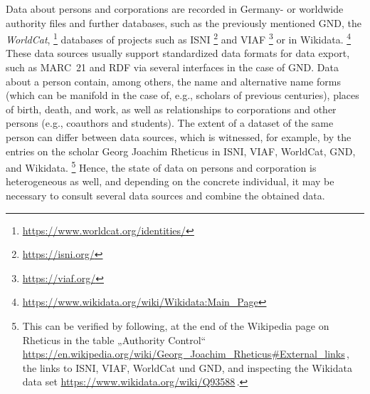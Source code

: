 Data about persons and corporations are recorded
in Germany- or worldwide authority files and further databases,
such as the previously mentioned GND,
the \emph{WorldCat},%
\footnote{\url{https://www.worldcat.org/identities/}}
databases of projects such as ISNI%
\footnote{\url{https://isni.org/}}
and VIAF%
\footnote{\url{https://viaf.org/}}
or in Wikidata.%
\footnote{\url{https://www.wikidata.org/wiki/Wikidata:Main_Page}}
These data sources usually support standardized data formats for data export,
such as MARC~21 and RDF via several interfaces in the case of GND.
Data about a person contain, among others, the name and alternative name forms
(which can be manifold in the case of, e.g., scholars of previous centuries),
places of birth, death, and work,
as well as relationships to corporations and other persons
(e.g., coauthors and students).
The extent of a dataset of the same person can differ between data sources,
which is witnessed, for example, by the entries on the scholar
Georg Joachim Rheticus in ISNI, VIAF, WorldCat, GND, and Wikidata.%
\footnote{%
  This can be verified by following,
  at the end of the Wikipedia page on Rheticus 
  in the table „Authority Control“ \url{https://en.wikipedia.org/wiki/Georg_Joachim_Rheticus\#External_links}\,,
  the links to ISNI, VIAF, WorldCat und GND,
  and inspecting the Wikidata data set
  \url{https://www.wikidata.org/wiki/Q93588}\,.
}
Hence, the state of data on persons and corporation is heterogeneous as well,
and depending on the concrete individual, it may be necessary
to consult several data sources and combine the obtained data.

